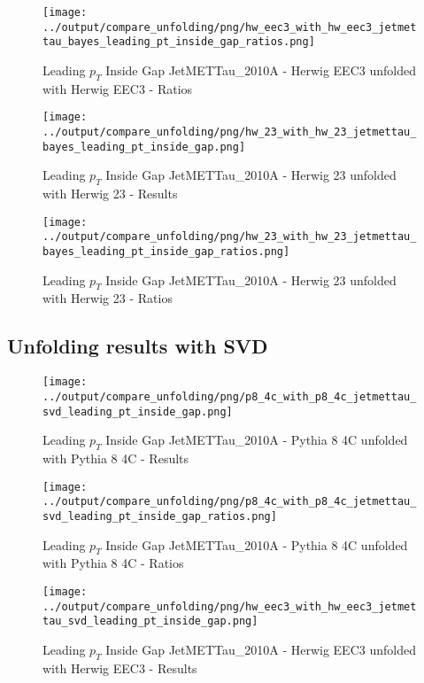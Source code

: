 \documentclass[11pt]{book}
\begin{document}
\begin{figure}[ht]
\centering
\texttt{[image: ../output/compare\_unfolding/png/hw\_eec3\_with\_hw\_eec3\_jetmettau\_bayes\_leading\_pt\_inside\_gap\_ratios.png]}
\caption{Leading $p_{T}$ Inside Gap JetMETTau\_2010A - Herwig EEC3 unfolded with Herwig EEC3 - Ratios}
\label{hw_eec3_hw_eec3_jetmettau_bayes_leading_pt_inside_gap_b}
\end{figure}

\begin{figure}[ht]
\centering
\texttt{[image: ../output/compare\_unfolding/png/hw\_23\_with\_hw\_23\_jetmettau\_bayes\_leading\_pt\_inside\_gap.png]}
\caption{Leading $p_{T}$ Inside Gap JetMETTau\_2010A - Herwig 23 unfolded with Herwig 23 - Results}
\label{hw_23_hw_23_jetmettau_bayes_leading_pt_inside_gap_a}
\end{figure}

\begin{figure}[ht]
\centering
\texttt{[image: ../output/compare\_unfolding/png/hw\_23\_with\_hw\_23\_jetmettau\_bayes\_leading\_pt\_inside\_gap\_ratios.png]}
\caption{Leading $p_{T}$ Inside Gap JetMETTau\_2010A - Herwig 23 unfolded with Herwig 23 - Ratios}
\label{hw_23_hw_23_jetmettau_bayes_leading_pt_inside_gap_b}
\end{figure}

\clearpage
\subsection{Unfolding results with SVD}

\begin{figure}[ht]
\centering
\texttt{[image: ../output/compare\_unfolding/png/p8\_4c\_with\_p8\_4c\_jetmettau\_svd\_leading\_pt\_inside\_gap.png]}
\caption{Leading $p_{T}$ Inside Gap JetMETTau\_2010A - Pythia 8 4C unfolded with Pythia 8 4C - Results}
\label{p8_p8_jetmettau_svd_leading_pt_inside_gap_a}
\end{figure}

\begin{figure}[ht]
\centering
\texttt{[image: ../output/compare\_unfolding/png/p8\_4c\_with\_p8\_4c\_jetmettau\_svd\_leading\_pt\_inside\_gap\_ratios.png]}
\caption{Leading $p_{T}$ Inside Gap JetMETTau\_2010A - Pythia 8 4C unfolded with Pythia 8 4C - Ratios}
\label{p8_p8_jetmettau_svd_leading_pt_inside_gap_b}
\end{figure}

\begin{figure}[ht]
\centering
\texttt{[image: ../output/compare\_unfolding/png/hw\_eec3\_with\_hw\_eec3\_jetmettau\_svd\_leading\_pt\_inside\_gap.png]}
\caption{Leading $p_{T}$ Inside Gap JetMETTau\_2010A - Herwig EEC3 unfolded with Herwig EEC3 - Results}
\label{hw_eec3_hw_eec3_jetmettau_svd_leading_pt_inside_gap_a}
\end{figure}
\end{document}
